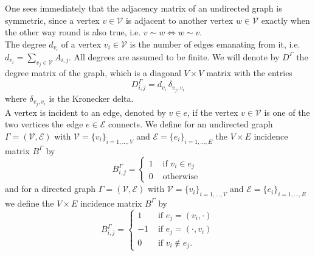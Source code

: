 One sees immediately that the adjacency matrix of an undirected graph is symmetric, since a vertex $v \in \mathcal{V}$ is adjacent to another vertex $w \in \mathcal{V}$ exactly when the other way round is also true, i.e. $v \sim w \Leftrightarrow w \sim v$. \\
The degree $d_{v_i}$ of a vertex $v_i \in \mathcal{V}$ is the number of edges emanating from it, i.e. $d_{v_i} = \sum_{v_j \in \mathcal{V}} A_{i, j}$. All degrees are assumed to be finite. We will denote by $D^{\Gamma}$ the degree matrix of the graph, which is a diagonal $V \times V$ matrix with the entries
\begin{equation}
    \label{degree matrix}
    D^{\Gamma}_{i, j} = d_{v_i} \, \delta_{v_j, v_i}
\end{equation}
where $\delta_{v_j, v_i}$ is the Kronecker delta. \\
A vertex is incident to an edge, denoted by $v \in e$, if the vertex $v \in \mathcal{V}$ is one of the two vertices the edge $e \in \mathcal{E}$ connects. We define for an undirected graph $\Gamma = (\mathcal{V}, \mathcal{E})$ with $\mathcal{V} = \{v_i\}_{i = 1, \ldots, V}$ and $\mathcal{E} = \{e_i\}_{i = 1, \ldots, E}$ the $V \times E$ incidence matrix $B^{\Gamma}$ by  
\begin{equation}
    \label{incidence matrix undirected}
    B^{\Gamma}_{i, j}= \begin{cases} 1 & \text { if } v_i \in e_j \\ 0 & \text { otherwise } \end{cases}
\end{equation}
and for a directed graph $\Gamma = (\mathcal{V}, \mathcal{E})$ with $\mathcal{V} = \{v_i\}_{i = 1, \ldots, V}$ and $\mathcal{E} = \{e_i\}_{i = 1, \ldots, E}$ we define the $V \times E$ incidence matrix $B^{\Gamma}$ by 
\begin{equation}
    \label{incidence matrix undirected}
    B^{\Gamma}_{i, j}= \begin{cases} 1 & \text { if } e_j = (v_i, \cdot) \\ -1 & \text { if } e_j = (\cdot, v_i) \\ 0 & \text { if } v_i \notin e_j. \end{cases}
\end{equation}


